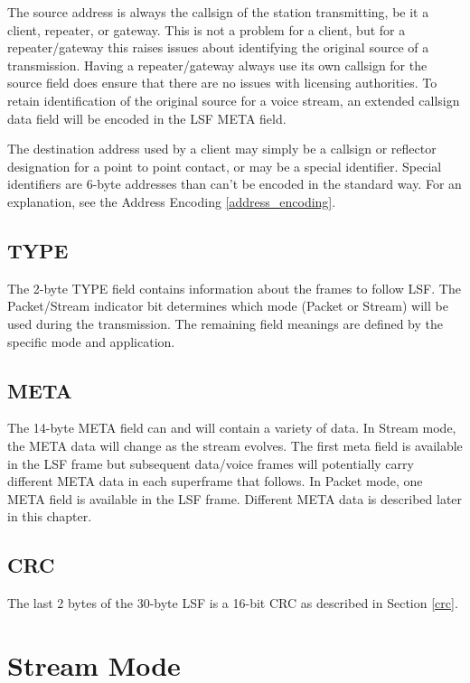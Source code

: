 \documentclass[a4paper,11pt,oneside]{book}
\begin{document}
The source address is always the callsign of the station transmitting, be it a client, repeater, or gateway. This is not a problem for a client, but for a repeater/gateway this raises issues about identifying the original source of a transmission. Having a repeater/gateway always use its own callsign for the source field does ensure that there are no issues with licensing authorities. To retain identification of the original source for a voice stream, an extended callsign data field will be encoded in the LSF META field.

The destination address used by a client may simply be a callsign or reflector designation for a point to point contact, or may be a special identifier. Special identifiers are 6-byte addresses than can't be encoded in the standard way. For an explanation, see the Address Encoding \autoref{address_encoding}.

\subsection{TYPE}

The 2-byte TYPE field contains information about the frames to follow LSF. The Packet/Stream indicator bit determines which mode (Packet or Stream) will be used during the transmission. The remaining field meanings are defined by the specific mode and application.

\subsection{META}

The 14-byte META field can and will contain a variety of data. In Stream mode, the META data will change as the stream evolves. The first meta field is available in the LSF frame but subsequent data/voice frames will potentially carry different META data in each superframe that follows. In Packet mode, one META field is available in the LSF frame. Different META data is described later in this chapter.

\subsection{CRC}

The last 2 bytes of the 30-byte LSF is a 16-bit CRC as described in Section \ref{crc}.

\section{Stream Mode}
\end{document}
